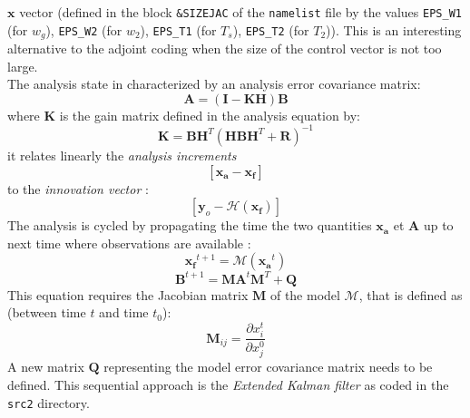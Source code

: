 \documentclass[12pt]{article}
\newcommand{\pd}[2]{\frac{\partial #1}{\partial #2}}
\begin{document}
$\mathbf{x}$ vector (defined in the block {\tt \&SIZEJAC} of the {\tt namelist}
file by the values {\tt EPS\_W1} (for $w_g$), {\tt EPS\_W2} (for $w_2$),
{\tt EPS\_T1} (for $T_s$), {\tt EPS\_T2} (for $T_2$)).
This is an interesting alternative to the adjoint coding when the size
of the control vector is not too large.
\\
The analysis state in characterized by an analysis error covariance matrix:
\[
\mathbf{A} = (\mathbf{I} - \mathbf{KH})\mathbf{B}
\]
where  $\mathbf{K}$ is the gain matrix defined in the analysis equation by:
\[
\mathbf{K} = \mathbf{B}\mathbf{H}^T(
 \mathbf{HBH}^T +  \mathbf{R})^{-1} 
\]
it relates linearly the {\it analysis increments}
\[
[\mathbf{x_a} - \mathbf{x_f}]
\]
to the  {\it innovation vector} :
\[  
[\mathbf{y}_o - \mathcal{H}(\mathbf{x_f})]
\]
The analysis is cycled by propagating the time the two quantities
$\mathbf{x_a}$ et $\mathbf{A}$
up to next time where observations are available :
\[
\mathbf{x_f}^{t+1} = \mathcal{M}(\mathbf{x_a}^t)
\]
\[
\mathbf{B}^{t+1} = \mathbf{MA}^t\mathbf{M}^T + \mathbf{Q}
\]
This equation requires the Jacobian matrix $\mathbf{M}$ of the model $\mathcal{M}$,
that is defined as (between time $t$ and time $t_0$):
\[
\mathbf{M}_{ij}= \pd{x_i^t}{x_j^0}
\]
A new matrix $\mathbf{Q}$ representing the model error covariance
matrix needs to be defined. 
This sequential approach is the {\it Extended Kalman filter}
as coded in the {\tt src2} directory.
\end{document}
